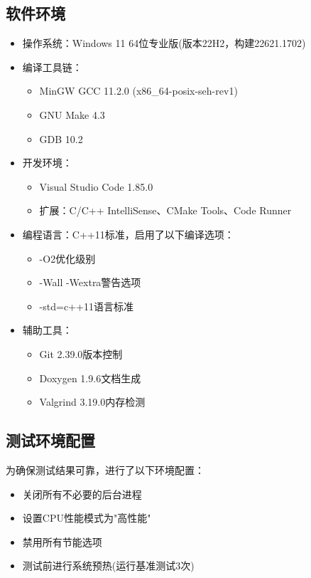 \documentclass[12pt,a4paper]{article}
\begin{document}
\subsection{软件环境}
\begin{itemize}
\item 操作系统：Windows 11 64位专业版(版本22H2，构建22621.1702)
\item 编译工具链：
  \begin{itemize}
  \item MinGW GCC 11.2.0 (x86\_64-posix-seh-rev1)
  \item GNU Make 4.3
  \item GDB 10.2
  \end{itemize}
\item 开发环境：
  \begin{itemize}
  \item Visual Studio Code 1.85.0
  \item 扩展：C/C++ IntelliSense、CMake Tools、Code Runner
  \end{itemize}
\item 编程语言：C++11标准，启用了以下编译选项：
  \begin{itemize}
  \item -O2优化级别
  \item -Wall -Wextra警告选项
  \item -std=c++11语言标准
  \end{itemize}
\item 辅助工具：
  \begin{itemize}
  \item Git 2.39.0版本控制
  \item Doxygen 1.9.6文档生成
  \item Valgrind 3.19.0内存检测
  \end{itemize}
\end{itemize}

\subsection{测试环境配置}
为确保测试结果可靠，进行了以下环境配置：
\begin{itemize}
\item 关闭所有不必要的后台进程
\item 设置CPU性能模式为"高性能"
\item 禁用所有节能选项
\item 测试前进行系统预热(运行基准测试3次)
\end{itemize}
\end{document}
